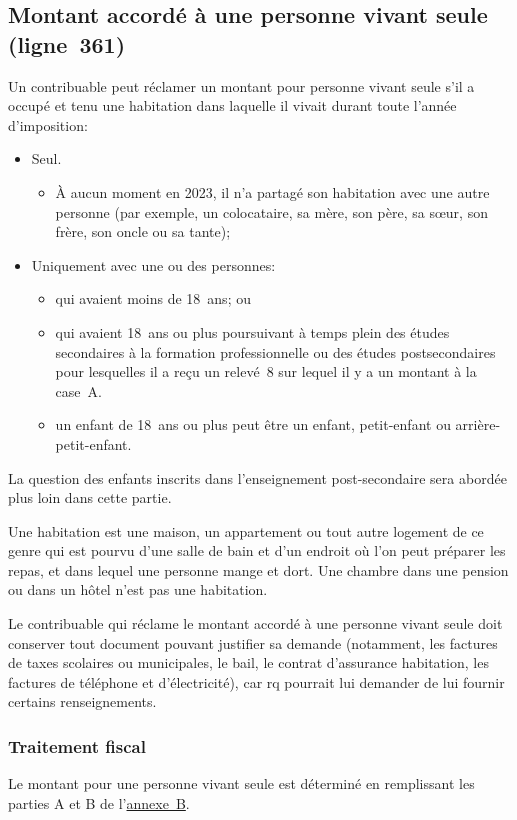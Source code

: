 \subsection{Montant accordé à une personne vivant seule (ligne~361)}
Un contribuable peut réclamer un montant pour personne vivant seule s'il a occupé et tenu une habitation dans laquelle il vivait durant toute l'année d'imposition:
\begin{itemize}
	\item Seul.
	\begin{itemize}
		\item À aucun moment en 2023, il n'a partagé son habitation avec une autre personne (par exemple, un colocataire, sa mère, son père, sa sœur, son frère, son oncle ou sa tante);
	\end{itemize}
	\item Uniquement avec une ou des personnes:
	\begin{itemize}
		\item qui avaient moins de 18~ans; ou
		\item qui avaient 18~ans ou plus poursuivant à temps plein des études secondaires à la formation professionnelle ou des études postsecondaires pour lesquelles il a reçu un relevé~8 sur lequel il y a un montant à la case~A. 
		\item un enfant de 18~ans ou plus peut être un enfant, petit-enfant ou arrière-petit-enfant.
	\end{itemize}
\end{itemize}

\begin{note}
	La question des enfants inscrits dans l'enseignement post-secondaire sera abordée plus loin dans cette partie.
\end{note}

Une habitation est une maison, un appartement ou tout autre logement de ce genre qui est pourvu d'une salle de bain et d'un endroit où l'on peut préparer les repas, et dans lequel une personne mange et dort. Une chambre dans une pension ou dans un hôtel n'est pas une habitation.

Le contribuable qui réclame le montant accordé à une personne vivant seule doit conserver tout document pouvant justifier sa demande (notamment, les factures de taxes scolaires ou municipales, le bail, le contrat d'assurance habitation, les factures de téléphone et d'électricité), car \acrfull{rq} pourrait lui demander de lui fournir certains renseignements.

\subsubsection{Traitement fiscal}
Le montant pour une personne vivant seule est déterminé en remplissant les parties A et B de l'\href{https://www.revenuquebec.ca/documents/fr/formulaires/tp/2023-12/TP-1.D.B%282023-12%29.pdf}{annexe~B}.

